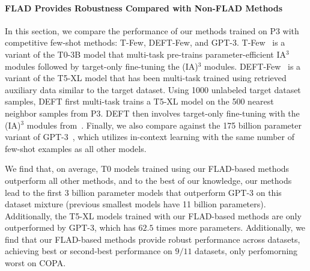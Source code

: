 
\paragraph{FLAD Provides Robustness Compared with Non-FLAD Methods}
In this section, we compare the performance of our methods trained on P3 with competitive few-shot methods: T-Few, DEFT-Few, and GPT-3.
T-Few~\citep{liu2020tfew} is a variant of the T0-3B model that multi-task pre-trains parameter-efficient IA$^{3}$ modules followed by target-only fine-tuning the (IA)$^{3}$ modules.
DEFT-Few~\citep{Ivison2022DEFT} is a variant of the T5-XL model that has been multi-task trained using retrieved auxiliary data similar to the target dataset. Using 1000 unlabeled target dataset samples, DEFT first multi-task trains a T5-XL model on the 500 nearest neighbor samples from P3. DEFT then involves target-only fine-tuning with the (IA)$^{3}$ modules from~\citet{liu2020tfew}.
Finally, we also compare against the 175 billion parameter variant of GPT-3~\citep{NEURIPS2020_1457c0d6}, which utilizes in-context learning with the same number of few-shot examples as all other models.

We find that, on average, T0 models trained using our FLAD-based methods outperform all other methods, and to the best of our knowledge, our methods lead to the first 3 billion parameter models that outperform GPT-3 on this dataset mixture (previous smallest models have 11 billion parameters). Additionally, the T5-XL models trained with our FLAD-based methods are only outperformed by GPT-3, which has $62.5$ times more parameters. %
Additionally, we find that our FLAD-based methods provide robust performance across datasets, achieving best or second-best performance on $9/11$ datasets, only perfomorning worst on COPA.
